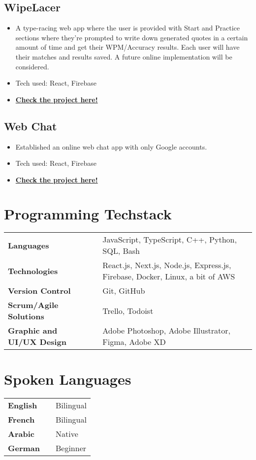 \documentclass[a4,10pt]{article}
\newenvironment{zitemize}{
\begin{itemize}\itemsep0pt \parskip0pt \parsep1pt}
{\end{itemize}\vspace{-0.5cm}}
\newcommand{\hskills}[1]{
\textbf{\bfseries #1} }
\begin{document}
\subsection*{WipeLacer {\normalsize\normalfont} \hfill} 
    \begin{zitemize}
        \item A type-racing web app where the user is provided with Start and Practice sections where they're prompted to write down generated quotes in a certain amount of time and get their WPM/Accuracy results. Each user will have their matches and results saved. A future online implementation will be considered.
        \item Tech used: React, Firebase
         \item \href{https://wipelacer.vercel.app}{\small \textbf {Check the project here!}}
    \end{zitemize}

\subsection*{Web Chat {\normalsize\normalfont} \hfill} 
    \begin{zitemize}
        \item Established an online web chat app with only Google accounts.
        \item Tech used: React, Firebase
        \item \href{https://webchat-37001.firebaseapp.com}{\small \textbf {Check the project here!}}
        
    \end{zitemize}
   


\section{Programming Techstack}
\begin{tabular}{p{11em} p{1em} p{43em}}
\hskills{Languages }&  & JavaScript, TypeScript, C++, Python, SQL, Bash \\
\hskills{Technologies} &  & React.js, Next.js, Node.js, Express.js, Firebase, Docker, Linux, a bit of AWS \\
\hskills{Version Control} &  & Git, GitHub \\
\hskills{Scrum/Agile Solutions} &  & Trello, Todoist \\
\hskills{Graphic and UI/UX Design} &  & Adobe Photoshop, Adobe Illustrator, Figma, Adobe XD 
\\
\end{tabular}



\section{Spoken Languages}
\begin{tabular}{p{11em} p{1em} p{43em}}
\hskills{English}&  &  Bilingual\\
\hskills{French}&  &  Bilingual\\
\hskills{Arabic}&  &  Native\\
\hskills{German}&  &  Beginner\\
\end{tabular}

\vspace{-0.2cm}
\end{document}
